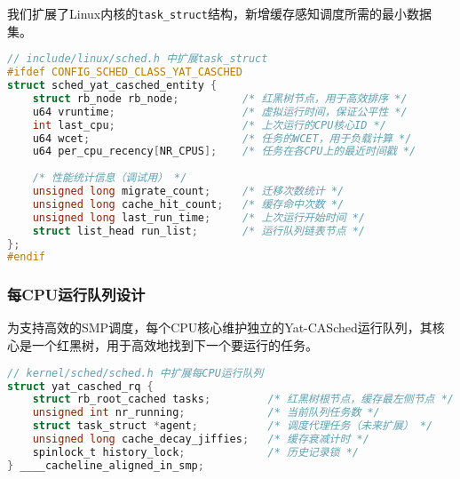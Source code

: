 我们扩展了Linux内核的\texttt{task\_struct}结构，新增缓存感知调度所需的最小数据集。

\begin{tcolorbox} [
    enhanced, colback=yellow!5, colframe=yellow!40!black, leftrule=3mm, rightrule=0mm, toprule=0mm, bottomrule=0mm, arc=2mm, left=5mm, right=5mm, top=3mm, bottom=3mm, fonttitle=\bfseries, title=\textbf{任务调度实体结构}
]
\begin{lstlisting}[language=C, basicstyle=\footnotesize\ttfamily, showstringspaces=false]
// include/linux/sched.h 中扩展task_struct
#ifdef CONFIG_SCHED_CLASS_YAT_CASCHED
struct sched_yat_casched_entity {
    struct rb_node rb_node;          /* 红黑树节点，用于高效排序 */
    u64 vruntime;                    /* 虚拟运行时间，保证公平性 */
    int last_cpu;                    /* 上次运行的CPU核心ID */
    u64 wcet;                        /* 任务的WCET，用于负载计算 */
    u64 per_cpu_recency[NR_CPUS];    /* 任务在各CPU上的最近时间戳 */
    
    /* 性能统计信息（调试用） */
    unsigned long migrate_count;     /* 迁移次数统计 */
    unsigned long cache_hit_count;   /* 缓存命中次数 */
    unsigned long last_run_time;     /* 上次运行开始时间 */
    struct list_head run_list;       /* 运行队列链表节点 */
};
#endif
\end{lstlisting}
\end{tcolorbox}

\subsubsection{每CPU运行队列设计}

为支持高效的SMP调度，每个CPU核心维护独立的Yat-CASched运行队列，其核心是一个红黑树，用于高效地找到下一个要运行的任务。

\begin{tcolorbox} [
    enhanced, colback=cyan!5, colframe=cyan!40!black, leftrule=3mm, rightrule=0mm, toprule=0mm, bottomrule=0mm, arc=2mm, left=5mm, right=5mm, top=3mm, bottom=3mm, fonttitle=\bfseries, title=\textbf{每CPU运行队列结构}
]
\begin{lstlisting}[language=C, basicstyle=\footnotesize\ttfamily, showstringspaces=false]
// kernel/sched/sched.h 中扩展每CPU运行队列
struct yat_casched_rq {
    struct rb_root_cached tasks;         /* 红黑树根节点，缓存最左侧节点 */
    unsigned int nr_running;             /* 当前队列任务数 */
    struct task_struct *agent;           /* 调度代理任务（未来扩展） */
    unsigned long cache_decay_jiffies;   /* 缓存衰减计时 */
    spinlock_t history_lock;             /* 历史记录锁 */
} ____cacheline_aligned_in_smp;
\end{lstlisting}
\end{tcolorbox}

